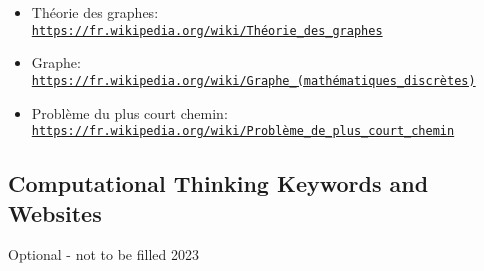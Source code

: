 \documentclass[a4paper,11pt]{report}
\newcommand{\BrochureUrlText}[1]{\texttt{#1}}
\begin{document}
\begin{itemize}
  \item Théorie des graphes:  \href{https://fr.wikipedia.org/wiki/Th\%C3\%A9orie_des_graphes}{\BrochureUrlText{https://fr.wikipedia.org/wiki/Théorie\_des\_graphes}}
  \item Graphe:  \href{https://fr.wikipedia.org/wiki/Graphe_(math\%C3\%A9matiques_discr\%C3\%A8tes)}{\BrochureUrlText{https://fr.wikipedia.org/wiki/Graphe\_(mathématiques\_discrètes)}}
  \item Problème du plus court chemin: \href{https://fr.wikipedia.org/wiki/Probl\%C3\%A8me_de_plus_court_chemin}{\BrochureUrlText{https://fr.wikipedia.org/wiki/Problème\_de\_plus\_court\_chemin}}
\end{itemize}


\subsection*{Computational Thinking Keywords and Websites}

Optional - not to be filled 2023
\end{document}
